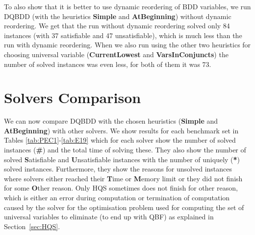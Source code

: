 \documentclass[
  digital, %
  color,
  twoside, %
  table,   %
  nolof,     %
  nolot,     %
]{fithesis3}
\theoremstyle{definition}
\theoremstyle{remark}
\newcommand{\QEsimple}{\textbf{Simple}}
\newcommand{\QUatbeginning}{\textbf{At\-Be\-gin\-ning}}
\newcommand{\QUcurrentlowest}{\textbf{CurrentLowest}}
\newcommand{\QUvarsinconjuncts}{\textbf{VarsInConjuncts}}
\begin{document}
To also show that it is better to use dynamic reordering of BDD variables, we run DQBDD (with the heuristics \QEsimple{} and \QUatbeginning{}) without dynamic reordering. We get that the run without dynamic reordering solved only 84 instances (with 37 satisfiable and 47 unsatisfiable), which is much less than the run with dynamic reordering. When we also run using the other two heuristics for choosing universal variable (\QUcurrentlowest{} and \QUvarsinconjuncts{}) the number of solved instances was even less, for both of them it was 73.

\section{Solvers Comparison}
We can now compare DQBDD with the chosen heuristics (\QEsimple{} and \QUatbeginning{}) with other solvers. We show results for each benchmark set in Tables \ref{tab:PEC1}-\ref{tab:E19} which for each solver show the number of solved instances (\textbf{\#}) and the total time of solving these. They also show the number of solved \textbf{S}atisfiable and \textbf{U}n\-sa\-ti\-sfi\-able instances with the number of uniquely (\textbf{*}) solved instances. Furthermore, they show the reasons for unsolved instances where solvers either reached their \textbf{T}ime or \textbf{M}emory limit or they did not finish for some \textbf{O}ther reason. Only HQS sometimes does not finish for other reason, which is either an error during computation or termination of computation caused by the solver for the optimisation problem used for computing the set of universal variables to eliminate (to end up with QBF) as explained in Section~\ref{sec:HQS}.
\end{document}
